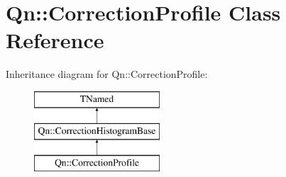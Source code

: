 \hypertarget{classQn_1_1CorrectionProfile}{}\section{Qn\+:\+:Correction\+Profile Class Reference}
\label{classQn_1_1CorrectionProfile}
Inheritance diagram for Qn\+:\+:Correction\+Profile\+:\begin{figure}[H]
\begin{center}
\leavevmode
\includegraphics[height=3.000000cm]{classQn_1_1CorrectionProfile}
\end{center}
\end{figure}
